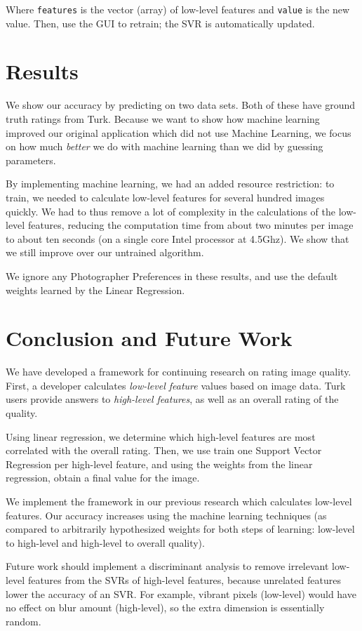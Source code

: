 \documentclass[11pt,letter]{article}
\begin{document}
Where \texttt{features} is the vector (array) of low-level features and \texttt{value} is the new value. Then, use the GUI to retrain; the SVR is automatically updated.

\section{Results}
We show our accuracy by predicting on two data sets. Both of these have ground truth ratings from Turk. Because we want to show how machine learning improved our original application\cite{imagesorter} which did not use Machine Learning, we focus on how much \textit{better} we do with machine learning than we did by guessing parameters.

By implementing machine learning, we had an added resource restriction: to train, we needed to calculate low-level features for several hundred images quickly. We had to thus remove a lot of complexity in the calculations of the low-level features, reducing the computation time from about two minutes per image to about ten seconds (on a single core Intel processor at 4.5Ghz). We show that we still improve over our untrained algorithm.

We ignore any Photographer Preferences in these results, and use the default weights learned by the Linear Regression.

\section{Conclusion and Future Work}
We have developed a framework for continuing research on rating image quality. First, a developer calculates \textit{low-level feature} values based on image data. Turk users provide answers to \textit{high-level features}, as well as an overall rating of the quality.

Using linear regression, we determine which high-level features are most correlated with the overall rating. Then, we use train one Support Vector Regression per high-level feature, and using the weights from the linear regression, obtain a final value for the image.

We implement the framework in our previous research which calculates low-level features. Our accuracy increases using the machine learning techniques (as compared to arbitrarily hypothesized weights for both steps of learning: low-level to high-level and high-level to overall quality).

Future work should implement a discriminant analysis to remove irrelevant low-level features from the SVRs of high-level features, because unrelated features lower the accuracy of an SVR. For example, vibrant pixels (low-level) would have no effect on blur amount (high-level), so the extra dimension is essentially random.
\end{document}
